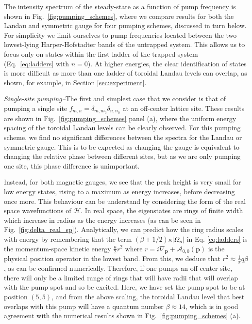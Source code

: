 \documentclass[twocolumn, 10pt, aps, superscriptaddress, floatfix, showpacs, pra, citeautoscript]{revtex4-1}
\begin{document}
The intensity spectrum of the steady-state as a function of pump
frequency is shown in Fig.~\ref{fig:pumping_schemes}, where we compare results for both the Landau and symmetric gauge for four pumping
schemes, discussed in turn below. For simplicity we limit ourselves to pump frequencies located between the two lowest-lying Harper-Hofstadter bands of the untrapped system. This allows us to focus only on states within the first ladder of the trapped system (Eq.~\eqref{eq:ladders} with $n = 0$). At higher energies, the clear identification of states is more difficult as more than one ladder of toroidal Landau levels can overlap, as shown, for example, in Section \ref{sec:experiment}. 

{\em{Single-site pumping--}}The first and simplest case that we consider is that of pumping a single site $f_{m,n} = \delta_{m,m_0} \delta_{n,n_0}$ at an off-center lattice site. These results are shown in Fig.~\ref{fig:pumping_schemes} panel (a), where the uniform energy spacing of the toroidal Landau levels can be clearly observed. For this pumping scheme, we find no significant differences between the spectra for the Landau or symmetric gauge. This is to be expected as changing the gauge is equivalent
to changing the relative phase between different sites, but as we are only pumping one site, this phase difference is unimportant.

 Instead, for both magnetic gauges, we see that the peak height is very small for low energy states, rising to a maximum as energy increases, before decreasing once more. This behaviour can be understand by considering the form of the real space wavefunctions of $\mathcal{H}$. 
In real space, the eigenstates are rings of finite width which increase in radius as the energy increases (as can be seen in Fig.~\ref{fig:delta_real_sp}). Analytically, we can predict how the ring radius scales with energy by remembering that the term
$(\beta + 1/2) \kappa |\Omega_n|$ in Eq. \ref{eq:ladders} is the momentum-space kinetic energy
$\frac{\kappa}{2}r^2$ where $r = i\nabla_{\mathbf{p}} + \mathcal{A}_{0, 0}(\mathbf{p})$ is the physical position operator in the lowest band. From this, we deduce that $r^2 \approx \frac{1}{\pi} q \beta$, as can be confirmed numerically. Therefore, if one pumps an off-center site, there will only be a
limited range of rings that will have radii that will overlap with
the pump spot and so be excited. Here, we have set the pump spot to be at position $(5,5)$, and from the above scaling, the toroidal Landau level that best overlaps with this pump will have a quantum number $\beta \approx 14$, which is in good agreement with the numerical results shown in
Fig.~\ref{fig:pumping_schemes} (a). 
\end{document}
